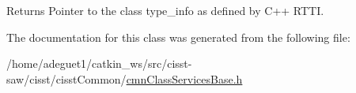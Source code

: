 \begin{DoxyReturn}{Returns}
Pointer to the class type\-\_\-info as defined by C++ R\-T\-T\-I. 
\end{DoxyReturn}


The documentation for this class was generated from the following file\-:\begin{DoxyCompactItemize}
\item 
/home/adeguet1/catkin\-\_\-ws/src/cisst-\/saw/cisst/cisst\-Common/\hyperlink{cmn_class_services_base_8h}{cmn\-Class\-Services\-Base.\-h}\end{DoxyCompactItemize}
